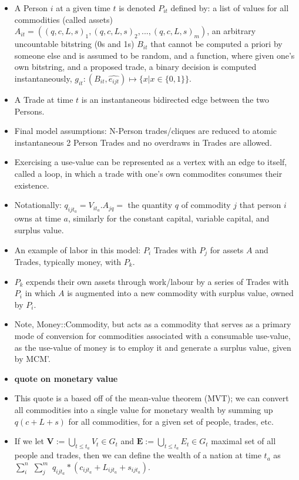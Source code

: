 \documentclass[12pt]{article}
\begin{document}
\begin{itemize}
    \item A Person $i$ at a given time $t$ is denoted $P_{it}$ defined by: a list of values for all commodities (called assets) $A_{it} = ((q, c, L, s)_{1}, (q, c, L, s)_{2},...,(q, c, L, s)_{m})$, an arbitrary uncountable bitstring (0s and 1s) $B_{it}$ that cannot be computed a priori by someone else and is assumed to be random, and a function, where given one's own bitstring, and a proposed trade, a binary decision is computed instantaneously, $g_{it} : (B_{it}, \hat{e_{ijt}}) \mapsto \{x | x \in  \{0, 1\}\}$.
    \item A Trade at time $t$ is an instantaneous bidirected edge between the two Persons. 
    \item Final model assumptions: N-Person trades/cliques are reduced to atomic instantaneous 2 Person Trades and no overdraws in Trades are allowed. 
    \item Exercising a use-value can be represented as a vertex with an edge to itself, called a loop, in which a trade with one's own commodites consumes their existence.
    \item Notationally: $q_{ijt_{a}} = V_{it_{a}}.A_{jq} =$ the quantity $q$ of commodity $j$ that person $i$ owns at time $a$, similarly for the constant capital, variable capital, and surplus value.
    \item An example of labor in this model: $P_i$ Trades with $P_j$ for assets $A$ and Trades, typically money, with $P_k$.
    \item $P_k$ expends their own assets through work/labour by a series of Trades with $P_i$ in which $A$ is augmented into a new commodity with surplus value, owned by $P_i$.  
    \item Note, Money::Commodity, but acts as a commodity that serves as a primary mode of conversion for commodities associated with a consumable use-value, as the use-value of money is to employ it and generate a surplus value, given by MCM'.
    \item \textbf{quote on monetary value}
    \item This quote is a based off of the mean-value theorem (MVT); we can convert all commodities into a single value for monetary wealth by summing up $q(c+L+s)$ for all commodities, for a given set of people, trades, etc.
    \item If we let $\boldsymbol{V} :=\bigcup\limits_{t \leq t_a} V_t \in G_t$ and $\boldsymbol{E} :=\bigcup\limits_{t \leq t_a} E_t \in G_t$ maximal set of all people and trades, then we can define the wealth of a nation at time $t_a$ as $\sum\limits_i^n$ $\sum\limits_j^m$ $q_{ijt_{a}} * (c_{ijt_{a}} + L_{ijt_{a}} + s_{ijt_{a}})$. 

\end{itemize}
\end{document}
